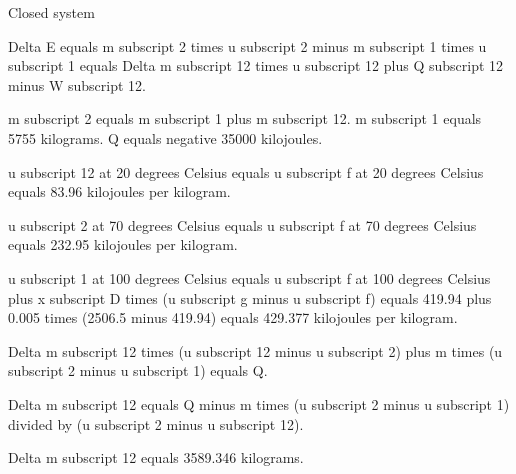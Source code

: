 Closed system  

Delta E equals m subscript 2 times u subscript 2 minus m subscript 1 times u subscript 1 equals Delta m subscript 12 times u subscript 12 plus Q subscript 12 minus W subscript 12.  

m subscript 2 equals m subscript 1 plus m subscript 12.  
m subscript 1 equals 5755 kilograms.  
Q equals negative 35000 kilojoules.  

u subscript 12 at 20 degrees Celsius equals u subscript f at 20 degrees Celsius equals 83.96 kilojoules per kilogram.  

u subscript 2 at 70 degrees Celsius equals u subscript f at 70 degrees Celsius equals 232.95 kilojoules per kilogram.  

u subscript 1 at 100 degrees Celsius equals u subscript f at 100 degrees Celsius plus x subscript D times (u subscript g minus u subscript f) equals 419.94 plus 0.005 times (2506.5 minus 419.94) equals 429.377 kilojoules per kilogram.  

Delta m subscript 12 times (u subscript 12 minus u subscript 2) plus m times (u subscript 2 minus u subscript 1) equals Q.  

Delta m subscript 12 equals Q minus m times (u subscript 2 minus u subscript 1) divided by (u subscript 2 minus u subscript 12).  

Delta m subscript 12 equals 3589.346 kilograms.